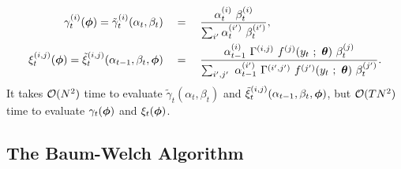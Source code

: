 \begin{align}
    \gamma_t^{(i)}(\boldsymbol{\phi}) = \tilde \gamma_{t}^{(i)}(\alpha_t,\beta_t) \quad &= \quad   \frac{\alpha_{t}^{(i)} ~ \beta_{t}^{(i)}}{\sum_{i'} \alpha_{t}^{(i')} ~ \beta_{t}^{(i')}}, \label{eqn:gamma} \\
    \xi_{t}^{(i,j)}(\boldsymbol{\phi}) = \tilde \xi_{t}^{(i,j)}(\alpha_{t-1},\beta_{t},\boldsymbol{\phi}) \quad &= \quad \frac{\alpha_{t-1}^{(i)} ~ \Gamma^{(i,j)} ~ f^{(j)}(y_{t} ~ ; ~\boldsymbol{\theta}) ~ \beta_{t}^{(j)}}{\sum_{i',j'} ~ \alpha_{t-1}^{(i')} ~ \Gamma^{(i',j')} ~ f^{(j')}(y_{t} ~ ; ~\boldsymbol{\theta}) ~ \beta_{t}^{(j')}} \label{eqn:xi}.
\end{align}
%
It takes $\mathcal{O}(N^2)$ time to evaluate $\tilde \gamma_{t}(\alpha_t,\beta_t)$ and $\tilde \xi_{t}^{(i,j)}(\alpha_{t-1},\beta_{t},\boldsymbol{\phi})$, but $\mathcal{O}(TN^2)$ time to evaluate $\gamma_t(\boldsymbol{\phi})$ and $\xi_t(\boldsymbol{\phi})$. %

\subsection{The Baum-Welch Algorithm}

